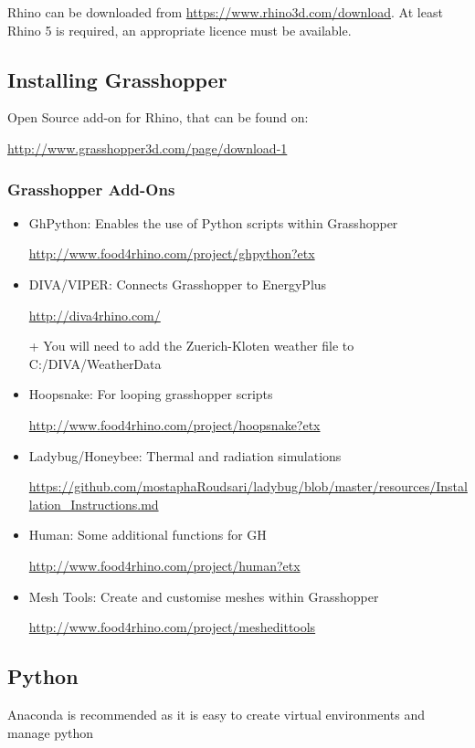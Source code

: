 	Rhino can be downloaded from \url{https://www.rhino3d.com/download}. At least Rhino 5 is required, an appropriate licence must be available.
	

	\subsection{Installing Grasshopper}
	Open Source add-on for Rhino, that can be found on:

	 \url{http://www.grasshopper3d.com/page/download-1}

	\subsubsection{Grasshopper Add-Ons}
	\begin{itemize}
	\item{GhPython: Enables the use of Python scripts within Grasshopper

		\url{http://www.food4rhino.com/project/ghpython?etx}}

	\item{DIVA/VIPER: Connects Grasshopper to EnergyPlus

		\url{http://diva4rhino.com/}

	 + You will need to add the Zuerich-Kloten weather file to C:/DIVA/WeatherData}

	\item{Hoopsnake: For looping grasshopper scripts

		\url{http://www.food4rhino.com/project/hoopsnake?etx}}
	\item{Ladybug/Honeybee: Thermal and radiation simulations

		\url{https://github.com/mostaphaRoudsari/ladybug/blob/master/resources/Installation_Instructions.md}}
	\item{Human: Some additional functions for GH 

		\url{http://www.food4rhino.com/project/human?etx}}
	\item{Mesh Tools: Create and customise meshes within Grasshopper

		\url{http://www.food4rhino.com/project/meshedittools}}
	\end{itemize}


	\subsection{Python}
	Anaconda is recommended as it is easy to create virtual environments and manage python

